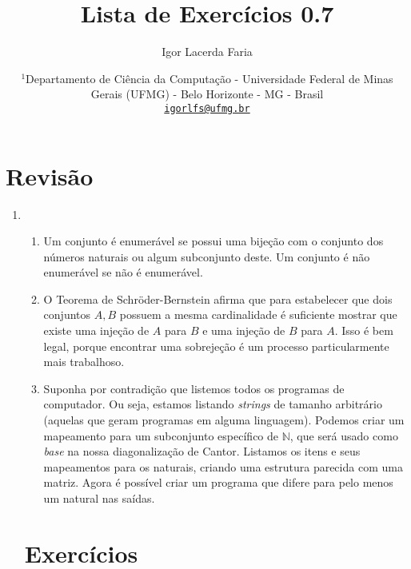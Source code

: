 \documentclass{article}
\author{Igor Lacerda Faria}
\begin{document}
\title{\textbf{Lista de Exercícios 0.7}}

\date{%
    \( ^1 \)Departamento de Ciência da Computação - Universidade Federal de Minas Gerais (UFMG) - Belo Horizonte - MG - Brasil \\ [3ex]
    \href{mailto:igorlfs@ufmg.br}{\nolinkurl{igorlfs@ufmg.br}}
}

\maketitle

\section*{Revisão}

\begin{enumerate}

    \item 

        \begin{enumerate}

            \item Um conjunto é enumerável se possui uma bijeção com o conjunto dos números naturais ou algum subconjunto deste. Um conjunto é não enumerável se não é enumerável.

            \item O Teorema de Schröder-Bernstein afirma que para estabelecer que dois conjuntos \( A, B \) possuem a mesma cardinalidade é suficiente mostrar que existe uma injeção de \( A \) para \( B \) e uma injeção de \( B \) para \( A \). Isso é bem legal, porque encontrar uma sobrejeção é um processo particularmente mais trabalhoso.

            \item Suponha por contradição que listemos todos os programas de computador. Ou seja, estamos listando \textit{strings} de tamanho arbitrário (aquelas que geram programas em alguma linguagem). Podemos criar um mapeamento para um subconjunto específico de \( \mathbb{N} \), que será usado como \textit{base} na nossa diagonalização de Cantor. Listamos os itens e seus mapeamentos para os naturais, criando uma estrutura parecida com uma matriz. Agora é possível criar um programa que difere para pelo menos um natural nas saídas.

        \end{enumerate}

        \section*{Exercícios}


\end{enumerate}
\end{document}
